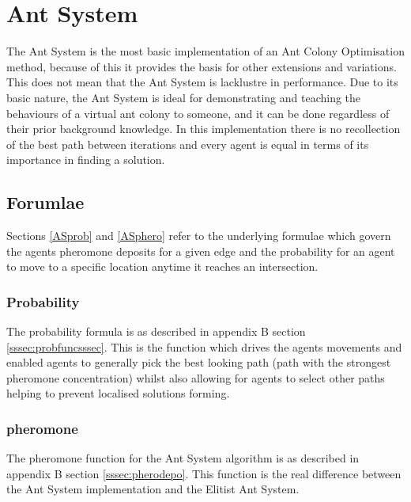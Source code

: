 \section{Ant System}
\label{sec:AntSystem}
The Ant System is the most basic implementation of an Ant Colony Optimisation method, because of this it provides the basis for other extensions and variations. This does not mean that the Ant System is lacklustre in performance. Due to its basic nature, the Ant System is ideal for demonstrating and teaching the behaviours of a virtual ant colony to someone, and it can be done regardless of their prior background knowledge. In this implementation there is no recollection of the best path between iterations and every agent is equal in terms of its importance in finding a solution.

\subsection{Forumlae}

Sections \ref{ASprob} and \ref{ASphero} refer to the underlying formulae which govern the agents pheromone deposits for a given edge and the probability for an agent to move to a specific location anytime it reaches an intersection.

\subsubsection{Probability}

The probability formula is as described in appendix B section \ref{sssec:probfuncsssec}. This is the function which drives the agents movements and enabled agents to generally pick the best looking path (path with the strongest pheromone concentration) whilst also allowing for agents to select other paths helping to prevent localised solutions forming.

\label{ASprob}

\subsubsection{pheromone}

The pheromone function for the Ant System algorithm is as described in appendix B section \ref{sssec:pherodepo}. This function is the real difference between the Ant System implementation and the Elitist Ant System.

\label{ASphero}

